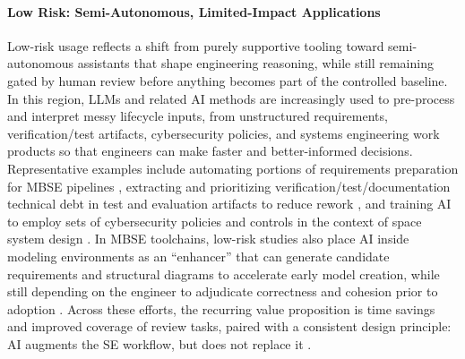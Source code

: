 \paragraph{Low Risk: Semi-Autonomous, Limited-Impact Applications}

Low-risk usage reflects a shift from purely supportive tooling toward semi-autonomous assistants that shape engineering reasoning, while still remaining gated by human review before anything becomes part of the controlled baseline. In this region, LLMs and related AI methods are increasingly used to pre-process and interpret messy lifecycle inputs, from unstructured requirements, verification/test artifacts, cybersecurity policies, and systems engineering work products so that engineers can make faster and better-informed decisions. Representative examples include automating portions of requirements preparation for MBSE pipelines \cite{riesener_ApplicationNaturalLanguage_2021}, extracting and prioritizing verification/test/documentation technical debt in test and evaluation artifacts to reduce rework \cite{Ouzzif_Leveraging_AI_Manage_Technical_Debt_Test_Evaluation_2025}, and training AI to employ sets of cybersecurity policies and controls in the context of space system design \cite{orosz_AIAidedDesignDevelopment_2024}. In MBSE toolchains, low-risk studies also place AI inside modeling environments as an “enhancer” that can generate candidate requirements and structural diagrams to accelerate early model creation, while still depending on the engineer to adjudicate correctness and cohesion prior to adoption \cite{johns_AISystemsModeling_2024}. Across these efforts, the recurring value proposition is time savings and improved coverage of review tasks, paired with a consistent design principle: AI augments the SE workflow, but does not replace it \cite{chagnon_CaseStudyAI_2024}.

